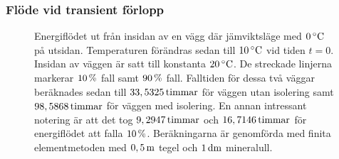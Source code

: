 \subsubsection{Flöde vid transient förlopp}


\begin{figure}
\centering

\vspace{5mm}
\caption{Energiflödet ut från insidan av en vägg där jämviktsläge med
$\unit[0]{^\circ C}$ på utsidan. Temperaturen förändras sedan
till $\unit[10]{^\circ C}$ vid tiden $t=0$. Insidan av väggen är satt till
konstanta $\unit[20]{^\circ C}$. De streckade linjerna markerar $\unit[10]{\%}$
fall samt $\unit[90]{\%}$ fall. Falltiden för dessa två väggar beräknades sedan
till $\unit[33,5325]{ timmar}$ för väggen utan isolering samt
$\unit[98,5868]{ timmar}$ för väggen med isolering. En annan intressant notering
är att det tog $\unit[9,2947]{ timmar}$ och $\unit[16,7146]{ timmar}$ för
energiflödet att falla $\unit[10]{\%}$. Beräkningarna är genomförda med finita
elementmetoden med $\unit[0,5]{m}$ tegel och $\unit[1]{dm}$ mineralull.}
\end{figure}
